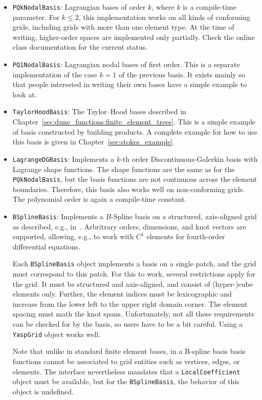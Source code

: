 \documentclass[a4paper,10pt,headings=normal,bibliography=totoc]{scrartcl}
\newcommand{\cpp}[1]{\lstinline[basicstyle=\ttfamily]!#1!}
\begin{document}
\begin{itemize}
 \item \cpp{PQkNodalBasis}: Lagrangian bases of order $k$, where $k$ is a compile-time parameter.
   For $k\le 2$, this implementation works on all kinds of conforming grids, including grids with more
   than one element type.  At the time of writing, higher-order spaces are implemented only partially.
   Check the online class documentation for the current status.

 \item \cpp{PQ1NodalBasis}: Lagrangian nodal bases of first order.  This is a separate implementation of
   the case $k=1$ of the previous basis.  It exists mainly so that people interested in writing their
   own bases have a simple example to look at.

 \item \cpp{TaylorHoodBasis}: The Taylor--Hood bases described in Chapter~\ref{sec:dune_functions:finite_element_trees}.
   This is a simple example of basis constructed by building products.
   A complete example for how to use this basis is given in Chapter~\ref{sec:stokes_example}.

 \item \cpp{LagrangeDGBasis}: Implements a $k$-th order Discontinuous-Galerkin basis with Lagrange shape functions.
   The shape functions are the same as for the \cpp{PQkNodalBasis},
   but the basis functions are not continuous across the element boundaries.  Therefore, this basis also
   works well on non-conforming grids.  The polynomial order is again a compile-time constant.

 \item \cpp{BSplineBasis}:  Implements a $B$-Spline basis on a structured, axis-aligned grid as described,
   e.g., in~\cite{cottrell_hughes_bazilevs:2009}.  Arbritrary orders, dimensions, and knot vectors are supported,
   allowing, e.g., to work with $C^1$ elements for fourth-order differential equations.

   Each \cpp{BSplineBasis} object implements a basis on a single patch, and the grid must correspond to this
   patch. For this to work, several restrictions apply for the grid.  It must be structured and axis-aligned,
   and consist of (hyper-)cube elements only.  Further, the element indices must be lexicographic and
   increase from the lower left to the upper right domain corner.  The element spacing must math the knot spans.
   Unfortunately, not all these requirements can be checked for by the basis, so users have to be a bit
   careful.  Using a \cpp{YaspGrid} object works well.

   Note that unlike in standard finite element bases, in a B-spline basis basis functions cannot be associated
   to grid entities such as vertices, edges, or elements.  The interface nevertheless mandates that a
   \cpp{LocalCoefficient} object must be available, but for the \cpp{BSplineBasis}, the behavior of this
   object is undefined.
\end{itemize}
\end{document}
